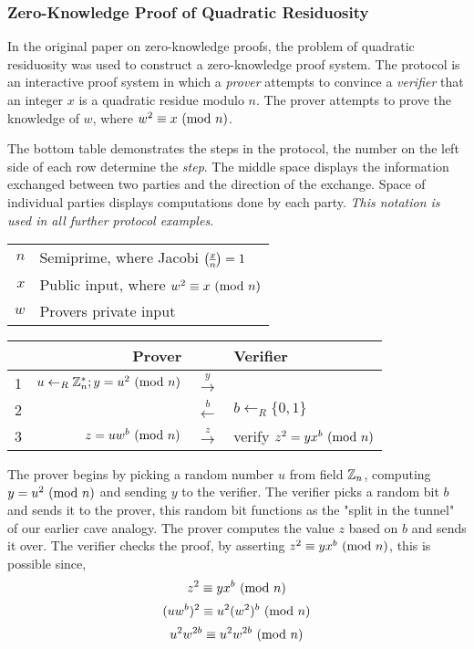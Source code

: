 \newpage
\subsubsection{Zero-Knowledge Proof of Quadratic Residuosity}
In the original paper \cite{goldwasser1989knowledge} on zero-knowledge proofs, the problem of quadratic residuosity was used to construct a zero-knowledge proof system.
The protocol is an interactive proof system in which a \textit{prover} attempts to convince a \textit{verifier} that an integer $x$ is a quadratic residue modulo $n$. 
The prover attempts to prove the knowledge of $w$, where $w^2 \equiv x \ (\mathrm{mod}\ n)$.


\bigskip
The bottom table demonstrates the steps in the protocol, 
the number on the left side of each row determine the \textit{step}.
The middle space displays the information exchanged between two parties and the direction of the exchange.
Space of individual parties displays computations done by each party. 
\textit{This notation is used in all further protocol examples.}\\
\begin{center}
	\begin{tabular}{rl}
		$n$ & Semiprime, where Jacobi $\legendre{x}{n} = 1$\\
 		$x$ & Public input, where $w^2 \equiv x \ (\mathrm{mod}\ n)$\\
 		$w$ & Provers private input\\
	\end{tabular}
\end{center}
\begin{center}
	\begin{tabular}{r|r|c|l}
		& Prover && Verifier\\
		\hline
		1&$u \leftarrow_R \Bbb{Z}_{n}^{*}; y = u^2 \ (\mathrm{mod}\ n)$ & $\xrightarrow{y}$\\
		2 & & $\xleftarrow{b}$ & $b \leftarrow_R \{0, 1\} $\\
		3 &$z = uw^b\ (\mathrm{mod}\ n)$ & $\xrightarrow z$ & verify $z^2 = yx^b \ (\mathrm{mod}\ n)$\\
	\end{tabular}
\end{center}
\bigskip
The prover begins by picking a random number $u$ from field $\Bbb{Z}_{n}$, computing $y = u^2 \ (\mathrm{mod}\ n)$ and sending $y$ to the verifier.
The verifier picks a random bit $b$ and sends it to the prover, this random bit functions as the "split in the tunnel" of our earlier cave analogy.
The prover computes the value $z$ based on $b$ and sends it over.
The verifier checks the proof, by asserting $z^2 \equiv yx^b \ (\mathrm{mod}\ n)$, this is possible since,
$$z^2 \equiv yx^b \ (\mathrm{mod}\ n)$$
$$(uw^b)^2 \equiv u^2(w^2)^b \ (\mathrm{mod}\ n)$$
$$u^2w^{2b} \equiv u^2w^{2b} \ (\mathrm{mod}\ n)$$

